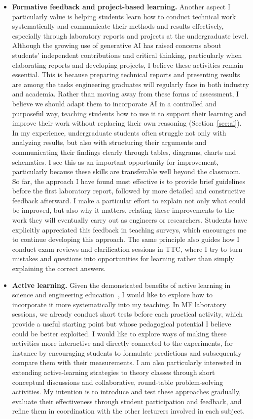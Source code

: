 \documentclass[11pt]{article}
\begin{document}
\begin{itemize}
  \item \textbf{Formative feedback and project-based learning.}
  Another aspect I particularly value is helping students learn how to conduct technical work systematically and communicate their methods and results effectively, especially through laboratory reports and projects at the undergraduate level. 
  Although the growing use of generative AI has raised concerns about students' independent contributions and critical thinking, particularly when elaborating reports and developing projects, I believe these activities remain essential. 
  This is because preparing technical reports and presenting results are among the tasks engineering graduates will regularly face in both industry and academia. 
  Rather than moving away from these forms of assessment, I believe we should adapt them to incorporate AI in a controlled and purposeful way, teaching students how to use it to support their learning and improve their work without replacing their own reasoning (Section~\ref{sec:ai}).
  In my experience, undergraduate students often struggle not only with analyzing results, but also with structuring their arguments and communicating their findings clearly through tables, diagrams, charts and schematics. I see this as an important opportunity for improvement, particularly because these skills are transferable well beyond the classroom.
  So far, the approach I have found most effective is to provide brief guidelines before the first laboratory report, followed by more detailed and constructive feedback afterward. 
  I make a particular effort to explain not only what could be improved, but also why it matters, relating these improvements to the work they will eventually carry out as engineers or researchers. 
  Students have explicitly appreciated this feedback in teaching surveys, which encourages me to continue developing this approach. 
  The same principle also guides how I conduct exam reviews and clarification sessions in TTC, where I try to turn mistakes and questions into opportunities for learning rather than simply explaining the correct answers.
  
  \item \textbf{Active learning.}
  Given the demonstrated benefits of active learning in science and engineering education~\cite{Freeman2014}, I would like to explore how to incorporate it more systematically into my teaching. 
  In MF laboratory sessions, we already conduct short tests before each practical activity, which provide a useful starting point but whose pedagogical potential I believe could be better exploited. 
  I would like to explore ways of making these activities more interactive and directly connected to the experiments, for instance by encouraging students to formulate predictions and subsequently compare them with their measurements. 
  I am also particularly interested in extending active-learning strategies to theory classes through short conceptual discussions and collaborative, round-table problem-solving activities. 
  My intention is to introduce and test these approaches gradually, evaluate their effectiveness through student participation and feedback, and refine them in coordination with the other lecturers involved in each subject.


\end{itemize}
\end{document}

